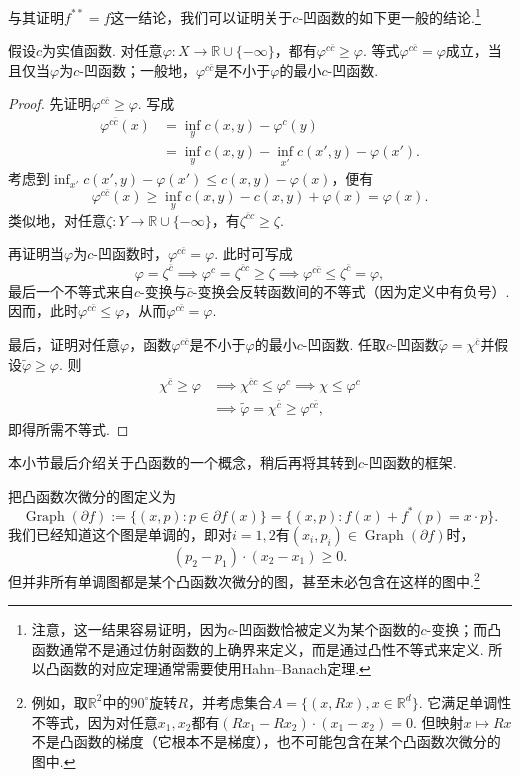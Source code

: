 与其证明$f^{**}=f$这一结论，我们可以证明关于$c$-凹函数的如下更一般的结论.\footnote{注意，这一结果容易证明，因为$c$-凹函数恰被定义为某个函数的$c$-变换；而凸函数通常不是通过仿射函数的上确界来定义，而是通过凸性不等式来定义. 所以凸函数的对应定理通常需要使用Hahn--Banach定理.}

\begin{proposition}\label{obj:1.34}
假设$c$为实值函数. 对任意$\varphi:X\to\mathbb R\cup\{-\infty\}$，都有$\varphi^{c\bar c}\ge\varphi$. 等式$\varphi^{c\bar c}=\varphi$成立，当且仅当$\varphi$为$c$-凹函数；一般地，$\varphi^{c\bar c}$是不小于$\varphi$的最小$c$-凹函数.
\end{proposition}
\begin{proof}
先证明$\varphi^{c\bar c}\ge\varphi$. 写成
\begin{equation*}
\begin{aligned}
\varphi^{c\bar c}(x)
&=\inf_y c(x,y)-\varphi^c(y)\\
&=\inf_y c(x,y)-\inf_{x'}c(x',y)-\varphi(x').
\end{aligned}
\end{equation*}
考虑到$\inf_{x'}c(x',y)-\varphi(x')\le c(x,y)-\varphi(x)$，便有
\[
\varphi^{c\bar c}(x)\ge\inf_y c(x,y)-c(x,y)+\varphi(x)=\varphi(x).
\]
类似地，对任意$\zeta:Y\to\mathbb R\cup\{-\infty\}$，有$\zeta^{\bar c c}\ge\zeta$.

再证明当$\varphi$为$c$-凹函数时，$\varphi^{c\bar c}=\varphi$. 此时可写成
\[
\varphi=\zeta^{\bar c}
\implies\varphi^c=\zeta^{\bar c c}\ge\zeta
\implies\varphi^{c\bar c}\le\zeta^{\bar c}=\varphi,
\]
最后一个不等式来自$c$-变换与$\bar c$-变换会反转函数间的不等式（因为定义中有负号）. 因而，此时$\varphi^{c\bar c}\le\varphi$，从而$\varphi^{c\bar c}=\varphi$.

最后，证明对任意$\varphi$，函数$\varphi^{c\bar c}$是不小于$\varphi$的最小$c$-凹函数. 任取$c$-凹函数$\widetilde\varphi=\chi^{\bar c}$并假设$\widetilde\varphi\ge\varphi$. 则
\begin{equation*}
\begin{aligned}
\chi^{\bar c}\ge\varphi
&\implies\chi^{\bar c c}\le\varphi^c
\implies\chi\le\varphi^c\\
&\implies\widetilde\varphi=\chi^{\bar c}\ge\varphi^{c\bar c},
\end{aligned}
\end{equation*}
即得所需不等式.
\end{proof}

本小节最后介绍关于凸函数的一个概念，稍后再将其转到$c$-凹函数的框架.

把凸函数次微分的图定义为
\[
\operatorname{Graph}(\partial f):=\{(x,p):p\in\partial f(x)\}
=\{(x,p):f(x)+f^*(p)=x\cdot p\}.
\]
我们已经知道这个图是单调的，即对$i=1,2$有$(x_i,p_i)\in\operatorname{Graph}(\partial f)$时，
\[
(p_2-p_1)\cdot(x_2-x_1)\ge0.
\]
但并非所有单调图都是某个凸函数次微分的图，甚至未必包含在这样的图中.\footnote{例如，取$\mathbb R^2$中的$90^\circ$旋转$R$，并考虑集合$A=\{(x,Rx),x\in\mathbb R^d\}$. 它满足单调性不等式，因为对任意$x_1,x_2$都有$(Rx_1-Rx_2)\cdot(x_1-x_2)=0$. 但映射$x\mapsto Rx$不是凸函数的梯度（它根本不是梯度），也不可能包含在某个凸函数次微分的图中.}

